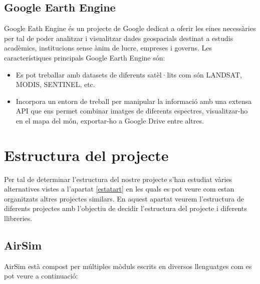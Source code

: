 \documentclass[10pt,a4paper,twocolumn,twoside]{article}
\begin{document}
\subsection{Google Earth Engine}

Google Eath Engine és un projecte de Google dedicat a oferir les eines necessàries per tal de poder analitzar i visualitzar dades geospacials destinat a estudis acadèmics, institucions sense ànim de lucre, empreses i governs. Les característiques principals Google Earth Engine són:

\begin{itemize}
  \item Es pot treballar amb datasets de diferents satèl·lits com són LANDSAT, MODIS, SENTINEL, etc.
  \item Incorpora un entorn de treball per manipular la informació amb una extensa API que ens permet combinar imatges de diferents espectres, visualitzar-ho en el mapa del món, exportar-ho a Google Drive entre altres.
\end{itemize}

\section{Estructura del projecte}

Per tal de determinar l'estructura del nostre projecte s'han estudiat vàries alternatives vistes a l'apartat \ref{estatart} en les quals es pot veure com estan organitzats altres projectes similars. En aquest apartat veurem l'estructura de diferents projectes amb l'objectiu de decidir l'estructura del projecte i diferents llibreries.

\subsection{AirSim} 

AirSim està compost per múltiples mòduls escrits en diversos llenguatges com es pot veure a continuació:
\end{document}
